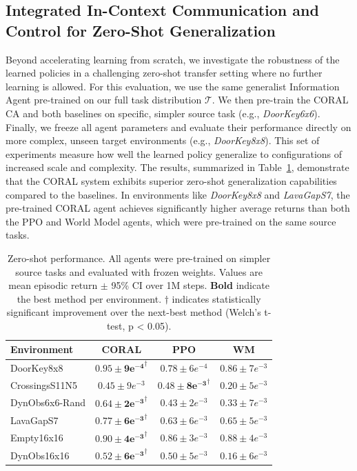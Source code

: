 \documentclass[letterpaper]{article}
\begin{document}
\subsection{Integrated In-Context Communication and Control for Zero-Shot Generalization}
Beyond accelerating learning from scratch, we investigate the robustness of the learned policies in a challenging zero-shot transfer setting where no further learning is allowed. For this evaluation, we use the same generalist Information Agent pre-trained on our full task distribution $\mathcal{T}$. We then pre-train the CORAL CA and both baselines on specific, simpler source task (e.g., \textit{DoorKey6x6}). Finally, we freeze all agent parameters and evaluate their performance directly on more complex, unseen target environments (e.g., \textit{DoorKey8x8}). This set of experiments measure how well the learned policy generalize to configurations of increased scale and complexity.
The results, summarized in Table~\ref{table: MaxPerGeneralization}, demonstrate that the CORAL system exhibits superior zero-shot generalization capabilities compared to the baselines. In environments like \textit{DoorKey8x8} and \textit{LavaGapS7}, the pre-trained CORAL agent achieves significantly higher average returns than both the PPO and World Model agents, which were pre-trained on the same source tasks.
\begin{table}[!ht]
\centering
\footnotesize
\setlength{\tabcolsep}{3.1pt}
\begin{tabular}{@{}lccc@{}}
\toprule
\textbf{Environment} & \textcolor[HTML]{923BE5}{CORAL} & \textcolor[HTML]{339332}{PPO} & \textcolor[HTML]{DD264A}{WM} \\
\midrule
DoorKey8x8 &  $\mathbf{0.95\pm9e^{-4}}^{\dag}$ & $0.78\pm6e^{-4}$ & $0.86\pm7e^{-3}$\\
CrossingsS11N5 & $0.45\pm9e^{-3}$ & $\mathbf{0.48\pm8e^{-3}}^{\dag}$ & $0.20\pm5e^{-3}$ \\
DynObs6x6-Rand & $\mathbf{0.64\pm2e^{-3}}^{\dag}$ & $0.43\pm2e^{-3}$ & $0.33\pm7e^{-3}$ \\
LavaGapS7 & $\mathbf{0.77\pm6e^{-3}}^{\dag}$ & $0.63 \pm 6e^{-3}$ & $0.65\pm5e^{-3}$\\
Empty16x16 & $\mathbf{0.90\pm 4e^{-3}}^{\dag}$ & $0.86\pm 3e^{-3}$ & $0.88\pm4e^{-3}$ \\
DynObs16x16 & $\mathbf{0.52\pm6e^{-3}}^{\dag}$ & $0.50\pm5e^{-3}$ & $0.16\pm6e^{-3}$ \\
\bottomrule
\end{tabular}
\vspace{-5pt}
\caption{Zero-shot performance. All agents were pre-trained on simpler source tasks and evaluated with frozen weights. Values are mean episodic return $\pm$ 95\% CI over 1M steps. \textbf{Bold} indicate the best method per environment. ${\dag}$ indicates statistically significant improvement over the next-best method (Welch’s t-test, p < 0.05).}
\label{table: MaxPerGeneralization}
\vspace{-5pt}
\end{table}
\end{document}

